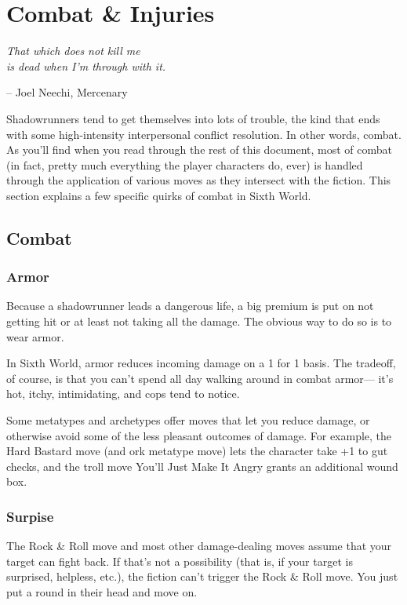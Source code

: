 \chapter{Combat \& Injuries} \label{combat}

\epigraph{\textit{That which does not kill me \\ is dead when I'm through with it.}}{-- Joel Neechi, Mercenary}

Shadowrunners tend to get themselves into lots of trouble, the kind that ends with some high-intensity interpersonal conflict resolution. In other words, combat. As you’ll find when you read through the rest of this document, most of combat (in fact, pretty much everything the player characters do, ever) is handled through the application of various moves as they intersect with the fiction. This section explains a few specific quirks of combat in Sixth World.


\section{Combat}
\subsection*{Armor}
Because a shadowrunner leads a dangerous life, a big premium is put on not getting hit or at least not taking all the damage. The obvious way to do so is to wear armor.

In Sixth World, armor reduces incoming damage on a 1 for 1 basis. The tradeoff, of course, is that you can’t spend all day walking around in combat armor— it’s hot, itchy, intimidating, and cops tend to notice.

Some metatypes and archetypes offer moves that let you reduce damage, or otherwise avoid some of the less pleasant outcomes of damage. For example, the Hard Bastard move (and ork metatype move) lets the character take +1 to gut checks, and the troll move You’ll Just Make It Angry grants an additional wound box.



\subsection*{Surpise}
The Rock \& Roll move and most other damage-dealing moves assume that your target can fight back. If that’s not a possibility (that is, if your target is surprised, helpless, etc.), the fiction can’t trigger the Rock \& Roll move. You just put a round in their head and move on.

